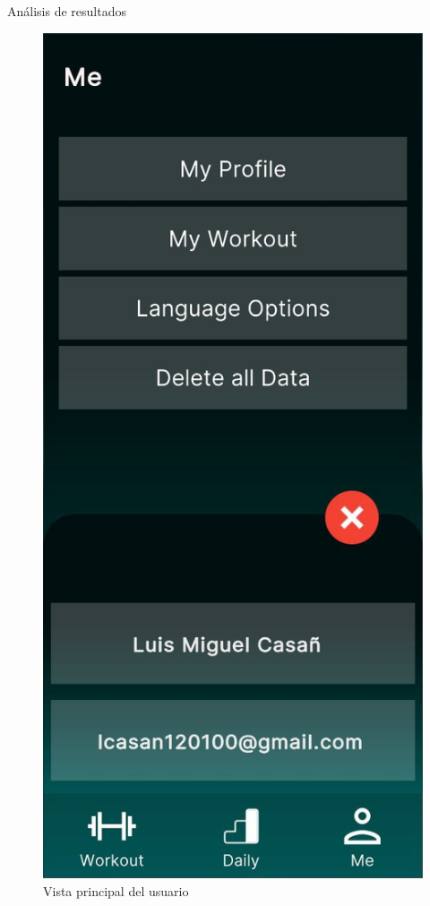 \begin{thesischapter}{3} {Análisis de resultados}
\begin{figure}[ht]
        \includegraphics[scale=0.17]{images/ui/3.jpg}
        \caption{Vista principal del usuario}
        \label{fig: ui1}
    \end{figure}



\end{thesischapter}
